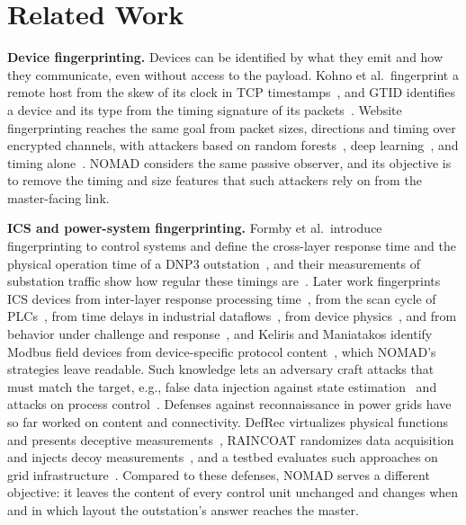 \section{Related Work}
\label{sec:related}

\textbf{Device fingerprinting.} Devices can be identified by what they emit and how they communicate, even without access to the payload. Kohno et al.\ fingerprint a remote host from the skew of its clock in TCP timestamps~\cite{kohno2005}, and GTID identifies a device and its type from the timing signature of its packets~\cite{gtid2015}. Website fingerprinting reaches the same goal from packet sizes, directions and timing over encrypted channels, with attackers based on random forests~\cite{kfp2016}, deep learning~\cite{sirinam2018}, and timing alone~\cite{tiktok2020}. NOMAD considers the same passive observer, and its objective is to remove the timing and size features that such attackers rely on from the master-facing link.

\textbf{ICS and power-system fingerprinting.} Formby et al.\ introduce fingerprinting to control systems and define the cross-layer response time and the physical operation time of a DNP3 outstation~\cite{formby2016}, and their measurements of substation traffic show how regular these timings are~\cite{formby2017}. Later work fingerprints ICS devices from inter-layer response processing time~\cite{shen2018}, from the scan cycle of PLCs~\cite{ahmed2021}, from time delays in industrial dataflows~\cite{pospisil2023}, from device physics~\cite{gu2018}, and from behavior under challenge and response~\cite{babun2021}, and Keliris and Maniatakos identify Modbus field devices from device-specific protocol content~\cite{keliris2016}, which NOMAD's strategies leave readable. Such knowledge lets an adversary craft attacks that must match the target, e.g., false data injection against state estimation~\cite{liufdia2009} and attacks on process control~\cite{cardenas2011}. Defenses against reconnaissance in power grids have so far worked on content and connectivity. DefRec virtualizes physical functions and presents deceptive measurements~\cite{defrec2020}, RAINCOAT randomizes data acquisition and injects decoy measurements~\cite{raincoat2019}, and a testbed evaluates such approaches on grid infrastructure~\cite{lintestbed2020}. Compared to these defenses, NOMAD serves a different objective: it leaves the content of every control unit unchanged and changes when and in which layout the outstation's answer reaches the master.

